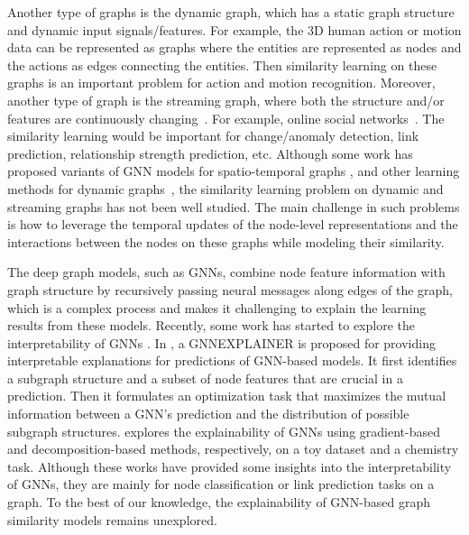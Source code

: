 \label{sec:chall_dynamic}
Another type of graphs is the dynamic graph, which has a static graph structure and dynamic input signals/features. For example, the 3D human action or motion data can be represented as graphs where the entities are represented as nodes and the actions as edges connecting the entities. Then similarity learning on these graphs is an important problem for action and motion recognition. Moreover, another type of graph is the streaming graph, where both the structure and/or features are continuously changing~. For example, online social networks~. The similarity learning would be important for change/anomaly detection, link prediction, relationship strength prediction, etc. Although some work has proposed variants of GNN models for spatio-temporal graphs , and other learning methods for dynamic graphs~, the similarity learning problem on dynamic and streaming graphs has not been well studied.  The main challenge in such problems is how to leverage the temporal updates of the node-level representations and the interactions between the nodes on these graphs while modeling their similarity.

The deep graph models, such as GNNs, combine node feature information with graph structure by recursively passing neural messages along edges of the graph, which is a complex process and makes it challenging to explain the learning results from these models. Recently, some work has started to explore the interpretability of GNNs . In , a GNNEXPLAINER is proposed for providing interpretable explanations for predictions of GNN-based models. It first identifies a subgraph structure and a subset of node features that are crucial in a prediction. Then it formulates an optimization task that maximizes the mutual information between a GNN's prediction and the distribution of possible subgraph structures.  explores the explainability of GNNs using gradient-based and decomposition-based methods, respectively, on a toy dataset and a chemistry task. Although these works have provided some insights into the interpretability of GNNs, they are mainly for node classification or link prediction tasks on a graph. To the best of our knowledge, the explainability of GNN-based graph similarity models remains unexplored.

